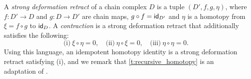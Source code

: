 \begin{remark*}
	A \emph{strong deformation retract} \cite{Lambe-Stasheff} of a chain complex $D$ is a tuple $(D',f,g,\eta)$, where $f\colon D' \to D$ and $g\colon D\to D'$ are chain maps, $g\circ f = \mathsf{id}_{D'}$ and $\eta$ is a homotopy from $\xi=f\circ g$ to $\mathsf{id}_D$. A \emph{contraction} \cite{EML,gonzalez2003computation} is a strong deformation retract that additionally satisfies the following:
	\[
	\text{(i)}\ \xi \circ \eta = 0, \quad
	\text{(ii)}\ \eta\circ \xi = 0, \quad
	\text{(iii)}\ \eta\circ\eta = 0.
	\]
	Using this language, an idempotent homotopy identity is a strong deformation retract satisfying (i), and we remark that \cref{t:recursive_homotopy} is an adaptation of \cite[p.367]{Lambe-Stasheff}.
\end{remark*}
%
%
%
